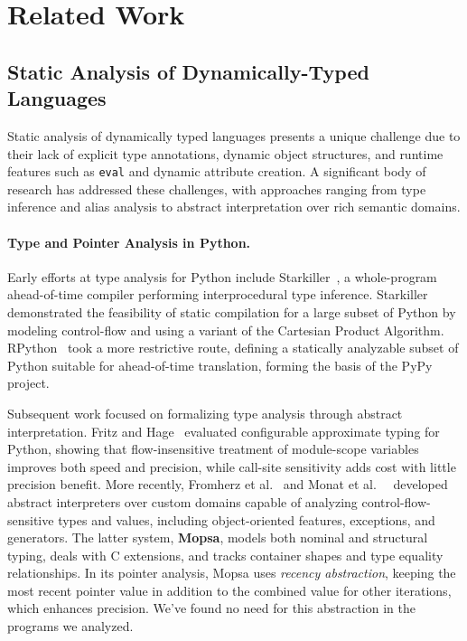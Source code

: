 \section{Related Work}
\label{sec:related}

\subsection{Static Analysis of Dynamically-Typed Languages}
Static analysis of dynamically typed languages presents a unique challenge due to their lack of explicit type annotations, dynamic object structures, and runtime features such as \texttt{eval} and dynamic attribute creation. A significant body of research has addressed these challenges, with approaches ranging from type inference and alias analysis to abstract interpretation over rich semantic domains.

\paragraph{Type and Pointer Analysis in Python.}
Early efforts at type analysis for Python include Starkiller~\cite{salib2004starkiller}, a whole-program ahead-of-time compiler performing interprocedural type inference. Starkiller demonstrated the feasibility of static compilation for a large subset of Python by modeling control-flow and using a variant of the Cartesian Product Algorithm. RPython~\cite{ancona2007rpython} took a more restrictive route, defining a statically analyzable subset of Python suitable for ahead-of-time translation, forming the basis of the PyPy project.

Subsequent work focused on formalizing type analysis through abstract interpretation. Fritz and Hage~\cite{fritz2017cost} evaluated configurable approximate typing for Python, showing that flow-insensitive treatment of module-scope variables improves both speed and precision, while call-site sensitivity adds cost with little precision benefit.
More recently, Fromherz et al.~\cite{fromherz2018static} and Monat et al.~\cite{monat2021static}~\cite{monat2021multilanguage} developed abstract interpreters over custom domains capable of analyzing control-flow-sensitive types and values, including object-oriented features, exceptions, and generators. The latter system, \textbf{Mopsa}, models both nominal and structural typing, deals with C extensions, and tracks container shapes and type equality relationships. In its pointer analysis, Mopsa uses \emph{recency abstraction}, keeping the most recent pointer value in addition to the combined value for other iterations, which enhances precision. We've found no need for this abstraction in the programs we analyzed. 

